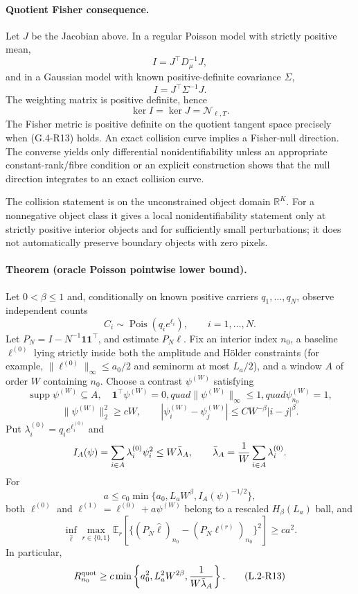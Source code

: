 \paragraph{Quotient Fisher consequence.}
Let $J$ be the Jacobian above.  In a regular Poisson model with
strictly positive mean,
\[
 I=J^\top D_\mu^{-1}J,
\]
and in a Gaussian model with known positive-definite covariance
$\Sigma$,
\[
 I=J^\top\Sigma^{-1}J.
\]
The weighting matrix is positive definite, hence
\[
 \ker I=\ker J=\mathcal N_{\ell,T}.
\]
The Fisher metric is positive definite on the quotient tangent space
precisely when (G.4-R13) holds.  An exact collision curve implies a
Fisher-null direction.  The converse yields only differential
nonidentifiability unless an appropriate constant-rank/fibre condition
or an explicit construction shows that the null direction integrates
to an exact collision curve.

The collision statement is on the unconstrained object domain
$\mathbb R^K$.  For a nonnegative object class it gives a local
nonidentifiability statement only at strictly positive interior objects
and for sufficiently small perturbations; it does not automatically
preserve boundary objects with zero pixels.

\paragraph{Theorem (oracle Poisson pointwise lower bound).}
Let $0<\beta\le1$ and, conditionally on known positive carriers
$q_1,\ldots,q_N$, observe independent counts
\[
 C_i\sim\operatorname{Pois}(q_i e^{\ell_i}),
 \qquad i=1,\ldots,N.
\]
Let $P_N=I-N^{-1}\mathbf1\mathbf1^\top$, and estimate $P_N\ell$.
Fix an interior index $n_0$, a baseline $\ell^{(0)}$ lying strictly
inside both the amplitude and H\"older constraints (for example,
$\|\ell^{(0)}\|_\infty\le a_0/2$ and seminorm at most $L_a/2$), and a
window $A$ of order $W$
containing $n_0$.  Choose a contrast
$\psi^{(W)}$ satisfying
\[
 \operatorname{supp}\psi^{(W)}\subseteq A,\quad
 \mathbf1^\top\psi^{(W)}=0,quad
 \|\psi^{(W)}\|_\infty\le1,quad
 \psi^{(W)}_{n_0}=1,
\]
\[
 \|\psi^{(W)}\|_2^2\ge cW,\qquad
 |\psi^{(W)}_i-\psi^{(W)}_j|
 \le C W^{-\beta}|i-j|^\beta.
\]
Put $\lambda_i^{(0)}=q_i e^{\ell_i^{(0)}}$ and
\[
 I_A(\psi)=\sum_{i\in A}\lambda_i^{(0)}\psi_i^2
 \le W\bar\lambda_A,
 \qquad
 \bar\lambda_A={1\over W}\sum_{i\in A}\lambda_i^{(0)}.
\]
For
\[
 a\le c_0\min\{a_0,L_aW^\beta,I_A(\psi)^{-1/2}\},
\]
both $\ell^{(0)}$ and
$\ell^{(1)}=\ell^{(0)}+a\psi^{(W)}$ belong to a rescaled
$H_\beta(L_a)$ ball, and
\begin{equation}
 \inf_{\widehat\ell}\max_{r\in\{0,1\}}
 \mathbb E_r\!\left[
  \{(P_N\widehat\ell)_{n_0}-(P_N\ell^{(r)})_{n_0}\}^2
 \right]
 \ge ca^2. \tag{L.1-R13}
\end{equation}
In particular,
\begin{equation}
 R_{n_0}^{\mathrm{quot}}
 \ge c\min\left\{a_0^2,L_a^2W^{2\beta},
                   {1\over W\bar\lambda_A}\right\}. \tag{L.2-R13}
\end{equation}

